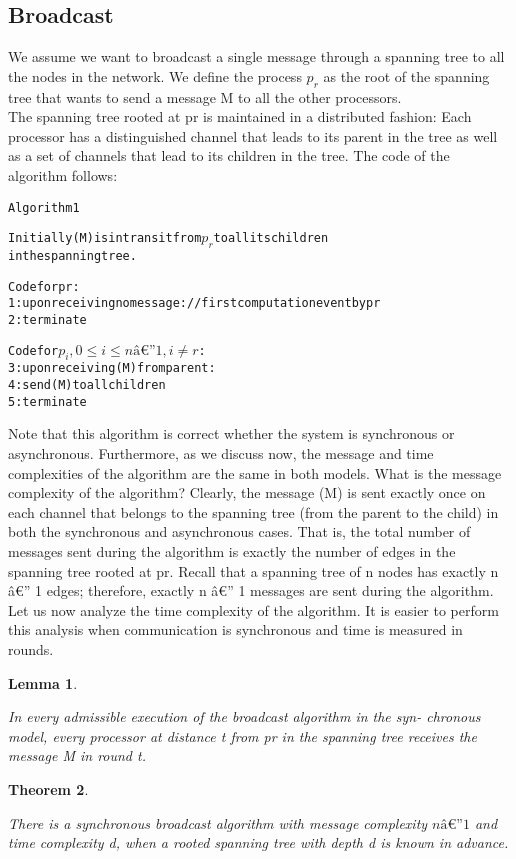 \documentclass{article}
\newtheorem{thm}{Theorem}[section]
\newtheorem{lem}[thm]{Lemma}
\newenvironment{theorem}{\begin{thm}\begin{rm}}%
{\end{rm}\end{thm}}
\newenvironment{lemma}{\begin{lem}\begin{rm}}%
{\end{rm}\end{lem}}
\begin{document}
\subsection{Broadcast}
We assume we want to broadcast a single message through a spanning tree to all the nodes in the network. We define the process $p_r$ as the root of the spanning tree that wants to send a message M to all the other processors.\\
The spanning tree rooted at pr is maintained in 
a distributed fashion: Each processor has a distinguished channel that leads to its 
parent in the tree as well as a set of channels that lead to its children in the tree. 
The code of the algorithm follows:
\begin{alltt}
Algorithm 1

Initially (M) is in transit from \(p_r\) to all its children
in the spanning tree.
 
Code for pr: 
	1: upon receiving no message: // first computation event by pr 
	2: terminate
	 
Code for \(p_i, 0 \leq i \leq n â€” 1, i \neq r\): 
	3: upon receiving (M) from parent: 
	4: send (M) to all children 
	5: terminate 
\end{alltt}
Note that this algorithm is correct whether the system is synchronous or asynchronous. Furthermore, as we discuss now, the message and time complexities of the 
algorithm are the same in both models. 
What is the message complexity of the algorithm? Clearly, the message (M) is 
sent exactly once on each channel that belongs to the spanning tree (from the parent to 
the child) in both the synchronous and asynchronous cases. That is, the total number 
of messages sent during the algorithm is exactly the number of edges in the spanning 
tree rooted at pr. Recall that a spanning tree of n nodes has exactly n â€” 1 edges; 
therefore, exactly n â€” 1 messages are sent during the algorithm. \\
Let us now analyze the time complexity of the algorithm. It is easier to perform 
this analysis when communication is synchronous and time is measured in rounds. \\

\begin{lemma}
In every admissible execution of the broadcast algorithm in the syn- chronous model, every processor at distance t from pr in the spanning tree receives the message M in round t. 
\end{lemma}

\begin{theorem}
There is a synchronous broadcast algorithm with message complexity 
$n â€” 1$ and time complexity d, when a rooted spanning tree with depth d is known in 
advance. 
\end{theorem}
\end{document}
